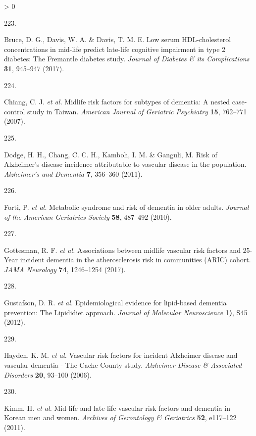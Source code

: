 \documentclass[a4paper, twoside]{templates/ociamthesis}
\newlength{\cslhangindent}
\newlength{\csllabelwidth}
\newenvironment{CSLReferences}[3] %
 {%
  \setlength{\parindent}{0pt}
  \ifodd #1 \everypar{\setlength{\hangindent}{\cslhangindent}}\ignorespaces\fi
  \ifnum #2 > 0
  \setlength{\parskip}{#2\baselineskip}
  \fi
 }%
 {}
\newcommand{\CSLLeftMargin}[1]{\parbox[t]{\maxof{\widthof{#1}}{\csllabelwidth}}{#1}}
\newcommand{\CSLRightInline}[1]{\parbox[t]{\linewidth - \csllabelwidth}{#1}}
\begin{document}
\begin{CSLReferences}{0}{0}
\leavevmode\hypertarget{ref-bruce2017}{}%
\CSLLeftMargin{223. }
\CSLRightInline{Bruce, D. G., Davis, W. A. \& Davis, T. M. E. Low serum {HDL}-cholesterol concentrations in mid-life predict late-life cognitive impairment in type 2 diabetes: The {Fremantle} diabetes study. \emph{Journal of Diabetes \& its Complications} \textbf{31}, 945--947 (2017).}

\leavevmode\hypertarget{ref-chiang2007}{}%
\CSLLeftMargin{224. }
\CSLRightInline{Chiang, C. J. \emph{et al.} Midlife risk factors for subtypes of dementia: A nested case-control study in {Taiwan}. \emph{American Journal of Geriatric Psychiatry} \textbf{15}, 762--771 (2007).}

\leavevmode\hypertarget{ref-dodge2011}{}%
\CSLLeftMargin{225. }
\CSLRightInline{Dodge, H. H., Chang, C. C. H., Kamboh, I. M. \& Ganguli, M. Risk of {Alzheimer}'s disease incidence attributable to vascular disease in the population. \emph{Alzheimer's and Dementia} \textbf{7}, 356--360 (2011).}

\leavevmode\hypertarget{ref-forti2010}{}%
\CSLLeftMargin{226. }
\CSLRightInline{Forti, P. \emph{et al.} Metabolic syndrome and risk of dementia in older adults. \emph{Journal of the American Geriatrics Society} \textbf{58}, 487--492 (2010).}

\leavevmode\hypertarget{ref-gottesman2017}{}%
\CSLLeftMargin{227. }
\CSLRightInline{Gottesman, R. F. \emph{et al.} Associations between midlife vascular risk factors and 25-{Year} incident dementia in the atherosclerosis risk in communities ({ARIC}) cohort. \emph{JAMA Neurology} \textbf{74}, 1246--1254 (2017).}

\leavevmode\hypertarget{ref-gustafson2012}{}%
\CSLLeftMargin{228. }
\CSLRightInline{Gustafson, D. R. \emph{et al.} Epidemiological evidence for lipid-based dementia prevention: The {Lipididiet} approach. \emph{Journal of Molecular Neuroscience} \textbf{1)}, S45 (2012).}

\leavevmode\hypertarget{ref-hayden2006}{}%
\CSLLeftMargin{229. }
\CSLRightInline{Hayden, K. M. \emph{et al.} Vascular risk factors for incident {Alzheimer} disease and vascular dementia - {The Cache County} study. \emph{Alzheimer Disease \& Associated Disorders} \textbf{20}, 93--100 (2006).}

\leavevmode\hypertarget{ref-kimm2011}{}%
\CSLLeftMargin{230. }
\CSLRightInline{Kimm, H. \emph{et al.} Mid-life and late-life vascular risk factors and dementia in {Korean} men and women. \emph{Archives of Gerontology \& Geriatrics} \textbf{52}, e117--122 (2011).}


\end{CSLReferences}
\end{document}
